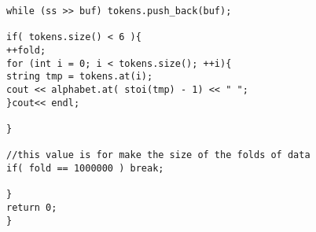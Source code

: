 \begin{figure}[t]
\begin{lstlisting}[frame=single,basicstyle=\ttfamily\tiny,]
while (ss >> buf) tokens.push_back(buf);

if( tokens.size() < 6 ){
++fold;
for (int i = 0; i < tokens.size(); ++i){
string tmp = tokens.at(i); 
cout << alphabet.at( stoi(tmp) - 1) << " ";
}cout<< endl;

}

//this value is for make the size of the folds of data
if( fold == 1000000 ) break;

}
return 0;
}
\end{lstlisting}



	
	
	
\end{figure}







